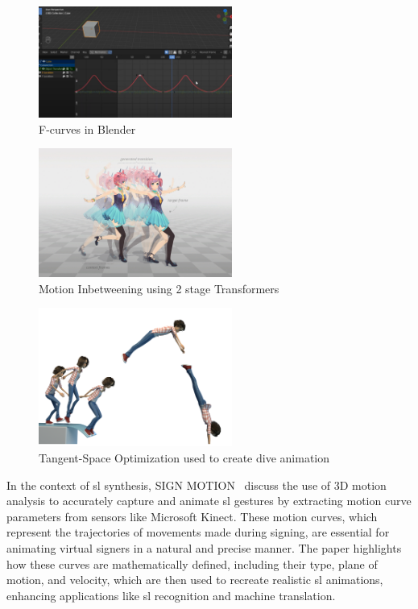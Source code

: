 \documentclass[../../main.tex]{subfiles}
\begin{document}
\begin{figure}
    \centering \includegraphics[width = 2.5in]{chapters/background_work/images/fcurves_blender.png}
    \caption{F-curves in Blender}
    \label{fig:fcurves_blender}
\end{figure}

\begin{figure}
    \centering \includegraphics[width = 2.5in]{chapters/background_work/images/inbetweening_transformers.jpg}
    \caption{Motion Inbetweening using 2 stage Transformers~\cite{10.1145/3306346.3322938}}
    \label{fig:inbetweening_transformers}
\end{figure}

\begin{figure}
    \centering \includegraphics[width = 2.5in]{chapters/background_work/images/inbetweening_disney.png}
    \caption{Tangent-Space Optimization used to create dive animation}
    \label{fig:inbetweening_disney}
\end{figure}

In the context of \gls{sl} synthesis, SIGN MOTION~\cite{inproceedings} discuss the use of 3D motion analysis to accurately capture and animate \gls{sl} gestures by extracting motion curve parameters from sensors like Microsoft Kinect. These motion curves, which represent the trajectories of movements made during signing, are essential for animating virtual signers in a natural and precise manner. The paper highlights how these curves are mathematically defined, including their type, plane of motion, and velocity, which are then used to recreate realistic \gls{sl} animations, enhancing applications like \gls{sl} recognition and machine translation.
\end{document}
